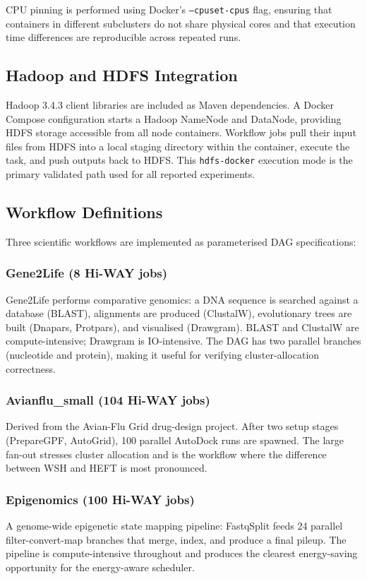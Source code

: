 \documentclass[12pt,a4paper]{article}
\begin{document}
CPU pinning is performed using Docker's \texttt{--cpuset-cpus} flag, ensuring that containers in different subclusters do not share physical cores and that execution time differences are reproducible across repeated runs.

\subsection{Hadoop and HDFS Integration}
Hadoop 3.4.3 client libraries are included as Maven dependencies. A Docker Compose configuration starts a Hadoop NameNode and DataNode, providing HDFS storage accessible from all node containers. Workflow jobs pull their input files from HDFS into a local staging directory within the container, execute the task, and push outputs back to HDFS. This \texttt{hdfs-docker} execution mode is the primary validated path used for all reported experiments.

\subsection{Workflow Definitions}
Three scientific workflows are implemented as parameterised DAG specifications:

\subsubsection{Gene2Life (8 Hi-WAY jobs)}
Gene2Life performs comparative genomics: a DNA sequence is searched against a database (BLAST), alignments are produced (ClustalW), evolutionary trees are built (Dnapars, Protpars), and visualised (Drawgram). BLAST and ClustalW are compute-intensive; Drawgram is IO-intensive. The DAG has two parallel branches (nucleotide and protein), making it useful for verifying cluster-allocation correctness.

\subsubsection{Avianflu\_small (104 Hi-WAY jobs)}
Derived from the Avian-Flu Grid drug-design project. After two setup stages (PrepareGPF, AutoGrid), 100 parallel AutoDock runs are spawned. The large fan-out stresses cluster allocation and is the workflow where the difference between WSH and HEFT is most pronounced.

\subsubsection{Epigenomics (100 Hi-WAY jobs)}
A genome-wide epigenetic state mapping pipeline: FastqSplit feeds 24 parallel filter-convert-map branches that merge, index, and produce a final pileup. The pipeline is compute-intensive throughout and produces the clearest energy-saving opportunity for the energy-aware scheduler.
\end{document}
